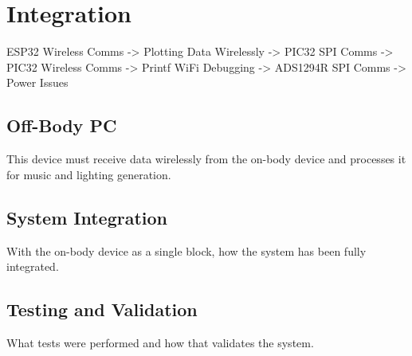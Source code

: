 \chapter{Integration}
ESP32 Wireless Comms -> Plotting Data Wirelessly -> PIC32 SPI Comms -> PIC32 Wireless Comms -> Printf WiFi Debugging -> ADS1294R SPI Comms -> Power Issues

\section{Off-Body PC}
This device must receive data wirelessly from the on-body device and processes it for music and lighting generation.




\section{System Integration}
With the on-body device as a single block, how the system has been fully integrated.

\section{Testing and Validation}
What tests were performed and how that validates the system.

